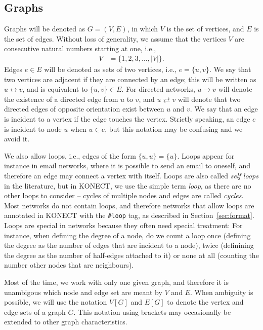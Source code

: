 \documentclass{article}
\begin{document}
\subsection{Graphs}
Graphs will be denoted as $G=(V,E)$, in which $V$ is the set of
vertices, and $E$ is the set of edges. Without loss of
generality, we assume that the vertices $V$ are consecutive natural
numbers starting at one, i.e.,
\begin{align}
  V &= \{ 1, 2, 3, \dotsc, |V| \}.
\end{align}
Edges $e\in E$ will be denoted as sets of two vertices, i.e.,
$e=\{u,v\}$.  We say that two vertices are adjacent if they are
connected by an edge; this will be written as $u \leftrightarrow v$, and is equivalent to $\{u,v\}\in E$. 
For directed networks, $u \rightarrow v$ will denote the existence of a
directed edge from $u$ to $v$, and $u \rightleftarrows v$ will denote
that two directed edges of opposite orientation exist between $u$ and $v$.
We say that an
edge is incident to a vertex if the edge touches the vertex. Strictly
speaking, an edge $e$ is incident to node $u$ when $u\in e$, but this
notation may be confusing and we avoid it. 

We also allow loops, i.e., edges of the form $\{u,u\}=\{u\}$.  Loops
appear for instance in email networks, where it is possible to send an
email to oneself, and therefore an edge may connect a vertex with
itself.  Loops are also called \emph{self loops} in the literature, but
in KONECT, we use the simple term \emph{loop}, as there are no other
loops to consider -- cycles of multiple nodes and edges are called
\emph{cycles}. 
Most networks do not contain loops, and therefore
networks that allow loops are annotated in KONECT with the 
\texttt{\#loop} tag, as described in Section~\ref{sec:format}.  
Loops are special in networks because they often need special treatment:
For instance, when defining the degree of a node, do we count a loop
once (defining the degree as the number of edges that are incident to a
node), twice (definining the degree as the number of half-edges attached
to it) or none at all (counting the number other nodes that are
neighbours).  

Most of the time, we work with only one given graph, and therefore it is
unambigous which node and edge set are meant by $V$ and $E$.  When
ambiguity is possible, we will use the notation
$V[G]$ and $E[G]$ to denote the vertex and edge sets of a graph $G$.
This notation using brackets may occasionally be extended to other graph
characteristics. 
\end{document}
